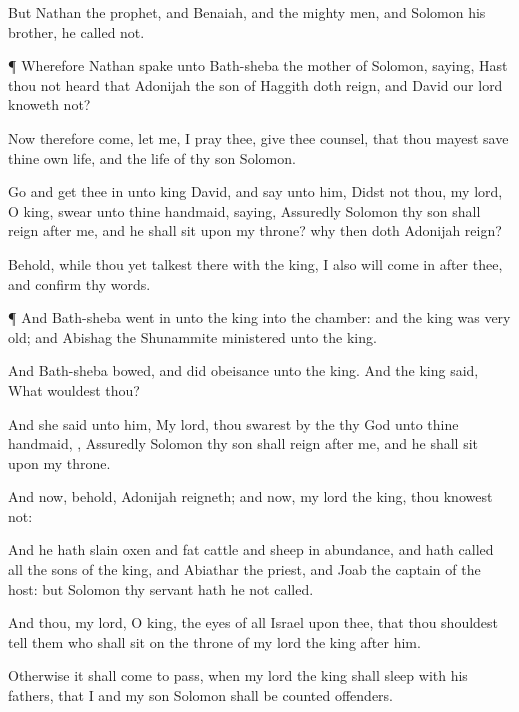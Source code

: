 {But
Nathan the
prophet, and
Benaiah, and the mighty
men, and
Solomon his
brother, he
called not.


\par }{\PP {}¶ Wherefore
Nathan
spake unto
Bath-sheba the
mother of
Solomon,
saying, Hast thou not
heard that
Adonijah the
son of
Haggith doth
reign, and
David our
lord
knoweth
{} not?

Now therefore
come, let me, I pray thee, give thee
counsel, that thou mayest
save thine own
life, and the
life of thy
son
Solomon.

Go and get thee
in unto
king
David, and
say unto him, Didst not thou, my
lord, O
king,
swear unto thine
handmaid,
saying,
Assuredly
Solomon thy
son shall
reign
after me, and he shall
sit upon my
throne? why then doth
Adonijah
reign?

Behold, while thou yet
talkest there with the
king, I also will come
in
after thee, and
confirm thy
words.


\par }{\PP {}¶ And
Bath-sheba went
in unto the
king into the
chamber: and the
king was
very
old; and
Abishag the
Shunammite
ministered unto the
king.

And
Bath-sheba
bowed, and did
obeisance unto the
king. And the
king
said, What wouldest thou?

And she
said unto him, My
lord, thou
swarest by the
{} thy
God unto thine
handmaid,
{}, Assuredly
Solomon thy
son shall
reign
after me, and he shall
sit upon my
throne.

And now, behold,
Adonijah
reigneth; and now, my
lord the
king, thou
knowest
{} not:

And he hath
slain
oxen and fat
cattle and
sheep in
abundance, and hath
called all the
sons of the
king, and
Abiathar the
priest, and
Joab the
captain of the
host: but
Solomon thy
servant hath he not
called.

And thou, my
lord, O
king, the
eyes of all
Israel
{} upon thee, that thou shouldest
tell them who shall
sit on the
throne of my
lord the
king
after him.

Otherwise it shall come to pass, when my
lord the
king shall
sleep with his
fathers, that I and my
son
Solomon shall be counted
offenders.


}
